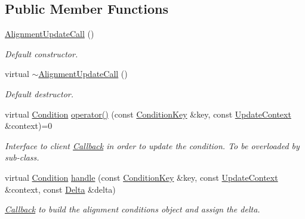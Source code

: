 \subsection*{Public Member Functions}
\begin{DoxyCompactItemize}
\item 
\hyperlink{class_d_d4hep_1_1_alignments_1_1_alignment_update_call_ad19c943603062f89569a8341b139025f}{Alignment\+Update\+Call} ()
\begin{DoxyCompactList}\small\item\em Default constructor. \end{DoxyCompactList}\item 
virtual \hyperlink{class_d_d4hep_1_1_alignments_1_1_alignment_update_call_a63a0be9ac654016954dcb1405954ac95}{$\sim$\+Alignment\+Update\+Call} ()
\begin{DoxyCompactList}\small\item\em Default destructor. \end{DoxyCompactList}\item 
virtual \hyperlink{class_d_d4hep_1_1_alignments_1_1_alignment_update_call_ac41c367dd7b7027a76d7b691223927fd}{Condition} \hyperlink{class_d_d4hep_1_1_alignments_1_1_alignment_update_call_a1180d2f8d62c0607b86c87853c7eeeb5}{operator()} (const \hyperlink{class_d_d4hep_1_1_alignments_1_1_alignment_update_call_a3c759edb169218bd8bc3b1c15d8af2e0}{Condition\+Key} \&key, const \hyperlink{class_d_d4hep_1_1_alignments_1_1_alignment_update_call_a648c995a6ab187911c79a687c8df0fa9}{Update\+Context} \&context)=0
\begin{DoxyCompactList}\small\item\em Interface to client \hyperlink{class_d_d4hep_1_1_callback}{Callback} in order to update the condition. To be overloaded by sub-\/class. \end{DoxyCompactList}\item 
virtual \hyperlink{class_d_d4hep_1_1_alignments_1_1_alignment_update_call_ac41c367dd7b7027a76d7b691223927fd}{Condition} \hyperlink{class_d_d4hep_1_1_alignments_1_1_alignment_update_call_a5f99eaf1be2d8307eb53f54d570a5ab6}{handle} (const \hyperlink{class_d_d4hep_1_1_alignments_1_1_alignment_update_call_a3c759edb169218bd8bc3b1c15d8af2e0}{Condition\+Key} \&key, const \hyperlink{class_d_d4hep_1_1_alignments_1_1_alignment_update_call_a648c995a6ab187911c79a687c8df0fa9}{Update\+Context} \&context, const \hyperlink{class_d_d4hep_1_1_alignments_1_1_alignment_update_call_a06a6522dece2daba45cdc69c079e144c}{Delta} \&delta)
\begin{DoxyCompactList}\small\item\em \hyperlink{class_d_d4hep_1_1_callback}{Callback} to build the alignment conditions object and assign the delta. \end{DoxyCompactList}\end{DoxyCompactItemize}
